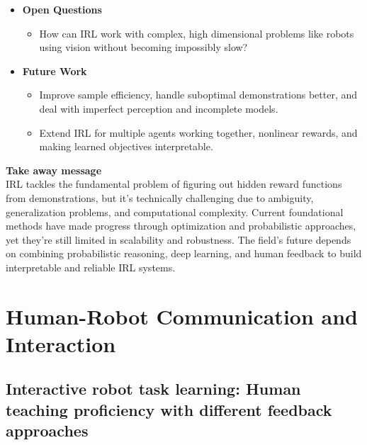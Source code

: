 \documentclass[report.tex]{subfiles}
\begin{document}
\begin{itemize}
    \item \noindent\textbf {Open Questions}
    \begin{itemize}
        \item     How can IRL work with complex, high dimensional problems like robots using vision without becoming impossibly slow? 

    \end{itemize}
    
    \item \noindent\textbf{Future Work}
    \begin{itemize}
        \item Improve sample efficiency, handle suboptimal demonstrations better, and deal with imperfect perception and incomplete models. 
        \item Extend IRL for multiple agents working together, nonlinear rewards, and making learned objectives interpretable. 
        
    \end{itemize}
\end{itemize}


\noindent\textbf{Take away message}  \\
IRL tackles the fundamental problem of figuring out hidden reward functions from demonstrations, but it's technically challenging due to ambiguity, generalization problems, and computational complexity. Current foundational methods have made progress through optimization and probabilistic approaches, yet they're still limited in scalability and robustness. The field's future depends on combining probabilistic reasoning, deep learning, and human feedback to build interpretable and reliable IRL systems.



















\section{Human-Robot Communication and Interaction}
\subsection{Interactive robot task learning: Human teaching proficiency with different feedback approaches} 
\end{document}
